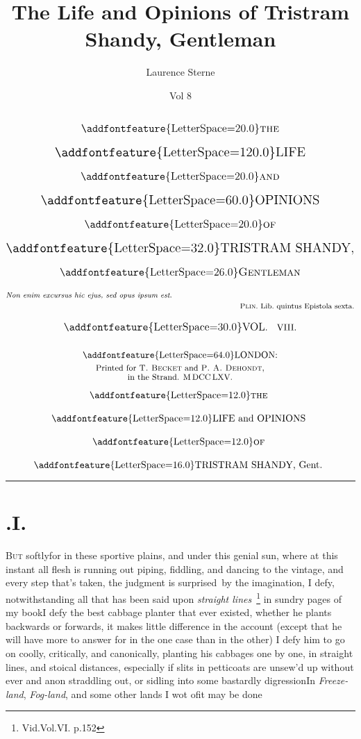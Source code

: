 \documentclass{article}
\title{The Life and Opinions of Tristram Shandy, Gentleman}
\author{Laurence Sterne}
\date{Vol 8}
\begin{document}
\pagestyle{empty}
\enlargethispage{72pt}
\[\vbox{\openup 12pt\halign{#\cr
\noalign{\vskip -20pt}
\hss\large{\addfontfeature{LetterSpace=20.0}\textsc{the}}\hss\cr
\hss\Large{\addfontfeature{LetterSpace=120.0}LIFE}\hss\cr
\hss\large{\addfontfeature{LetterSpace=20.0}\textsc{and}}\hss\cr
\hss\Large{\addfontfeature{LetterSpace=60.0}OPINIONS}\hss\cr
\hss\large{\addfontfeature{LetterSpace=20.0}\textsc{of}}\hss\cr
\hss\Large{\addfontfeature{LetterSpace=32.0}TRISTRAM SHANDY},\hss\cr
\hss\large{\addfontfeature{LetterSpace=26.0}\textsc{Gentleman}}\hss\cr
{\footnotesize\textit{Non enim excursus hic ejus, sed opus ipsum est}.}\hss\cr
\noalign{\vskip -12pt}
\hss{\footnotesize\textsc{Plin}.\@ Lib.\@ quintus Epistola sexta.}\cr
\hss{\large\addfontfeature{LetterSpace=30.0}VOL}.\quad VIII.\hss\cr
\noalign{\vskip 6pt}
\hss{\addfontfeature{LetterSpace=64.0}LONDON}:\hss\cr
\noalign{\vskip -10pt}
\hss \small Printed for \textsc{T.\@ Becket} and \textsc{P.\@ A.\@ Dehondt},\hss\cr
\noalign{\vskip -14pt}
\hss \small in the Strand. M\,DCC\,LXV.\hss\cr
}}\]

\newpage\null
\cleardoublepage
\setcounter{page}{1}
\pagestyle{fancy}
\thispagestyle{empty}
\hbox{}\vskip -36pt

\[\vbox{\openup 12pt\halign{\hss # \hss\cr
{\addfontfeature{LetterSpace=12.0}\textsc{the}}\cr
{\addfontfeature{LetterSpace=12.0}LIFE and OPINIONS}\cr
{\addfontfeature{LetterSpace=12.0}\textsc{of}}\cr
{\addfontfeature{LetterSpace=16.0}TRISTRAM SHANDY}, Gent.\cr}}\]

\vskip 12pt
\hrule
\sloppy
\setlength{\baselineskip}{14pt}

\section{.\enspace I.}

\lettrine{\Tsk B}{ut} softly\tsk for in these sportive plains,
and under this genial sun, where at this instant all flesh is
running out piping, fiddling, and dancing to the vintage, and
every step that’s taken, the judgment is surprised~by the
imagination, I defy, notwithstanding
all that has been said upon \textit{straight
lines}~\footnote{Vid.\@ Vol.\@ VI. p.\@ 152} in sundry pages of
my book\tsk I defy the best cabbage planter that ever existed,
whether he plants backwards or forwards, it makes little
difference in the account (except that he will have more to
answer for in the one case than in the other)\tsk
I defy him to go on coolly, critically, and canonically,
planting his cabbages one by one, in straight lines, and stoical
distances, especially if slits in petticoats are unsew’d up\tsk
without ever and anon straddling out, or sidling into some
bastardly digression\tsh In \textit{Freeze-land},
\textit{Fog-land}, and some other lands I wot of\tsk it may be done\tsh
\end{document}
